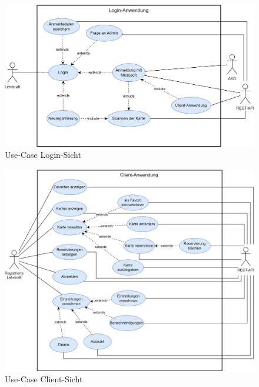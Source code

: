 \begin{figure}[h!]
  \centering
  \includegraphics[width=1\textwidth]{FLUTTER/images/GP/login-use-case.png}
  \caption{Use-Case Login-Sicht \cite{Flutter-Architektur-SVG}}
\end{figure}
\newpage

\begin{figure}[h!]
  \centering
  \includegraphics[width=1\textwidth]{FLUTTER/images/GP/client-use-case.png}
  \caption{Use-Case Client-Sicht \cite{Flutter-Architektur-SVG}}
\end{figure}
\newpage

